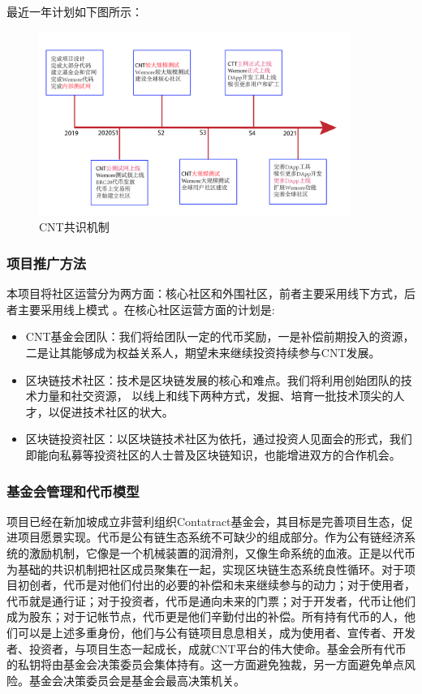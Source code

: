 \documentclass[a4paper,12pt]{article}
\begin{document}
最近一年计划如下图所示：


\begin {figure} [htbp]
\centering \includegraphics [width = 4in] {pic_cn/timeline.png}
\caption {CNT共识机制} \label {fig: timeline}
\end {figure}


\subsubsection{项目推广方法}

本项目将社区运营分为两方面：核心社区和外围社区，前者主要采用线下方式，后者主要采用线上模式 。在核心社区运营方面的计划是:

\begin{itemize}[itemindent=1em]
\item CNT基金会团队：我们将给团队一定的代币奖励，一是补偿前期投入的资源，二是让其能够成为权益关系人，期望未来继续投资持续参与CNT发展。
\item 区块链技术社区：技术是区块链发展的核心和难点。我们将利用创始团队的技术力量和社交资源， 以线上和线下两种方式，发掘、培育一批技术顶尖的人才，以促进技术社区的状大。
\item 区块链投资社区：以区块链技术社区为依托，通过投资人见面会的形式，我们即能向私募等投资社区的人士普及区块链知识，也能增进双方的合作机会。
\end{itemize}

\subsubsection{基金会管理和代币模型}

项目已经在新加坡成立非营利组织Contatract基金会，其目标是完善项目生态，促进项目愿景实现。代币是公有链生态系统不可缺少的组成部分。作为公有链经济系统的激励机制，它像是一个机械装置的润滑剂，又像生命系统的血液。正是以代币为基础的共识机制把社区成员聚集在一起，实现区块链生态系统良性循环。对于项目初创者，代币是对他们付出的必要的补偿和未来继续参与的动力；对于使用者，代币就是通行证；对于投资者，代币是通向未来的门票；对于开发者，代币让他们成为股东；对于记帐节点，代币更是他们辛勤付出的补偿。所有持有代币的人，他们可以是上述多重身份，他们与公有链项目息息相关，成为使用者、宣传者、开发者、投资者，与项目生态一起成长，成就CNT平台的伟大使命。基金会所有代币的私钥将由基金会决策委员会集体持有。这一方面避免独裁，另一方面避免单点风险。基金会决策委员会是基金会最高决策机关。
\end{document}
